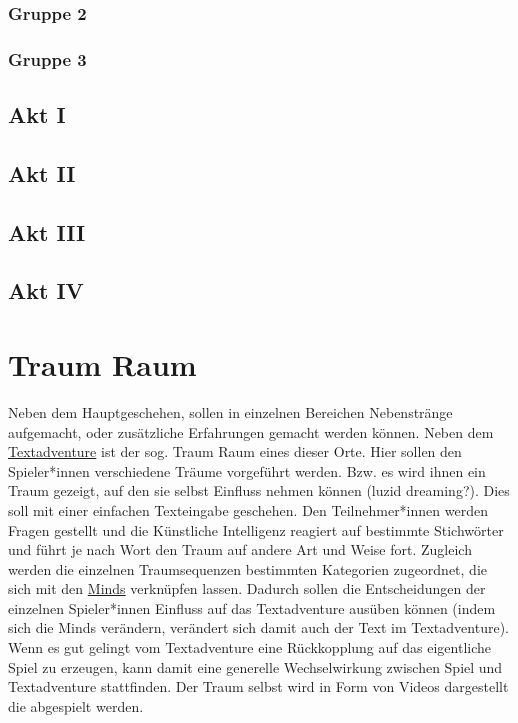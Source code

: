 \documentclass[12pt, a4paper, openany]{report}
\begin{document}
\subsection{Gruppe 2}
\subsection{Gruppe 3}
\section{Akt I}
\section{Akt II}
\section{Akt III}
\section{Akt IV}



\chapter{Traum Raum}
Neben dem Hauptgeschehen, sollen in einzelnen Bereichen Nebenstränge aufgemacht, oder zusätzliche Erfahrungen gemacht werden können. 
Neben dem \hyperref[textadventure]{Textadventure} ist der sog. \glqq Traum Raum\grqq{} eines dieser Orte.
Hier sollen den Spieler*innen verschiedene Träume vorgeführt werden. 
Bzw. es wird ihnen ein Traum gezeigt, auf den sie selbst Einfluss nehmen können (luzid dreaming?).
Dies soll mit einer einfachen Texteingabe geschehen.
Den Teilnehmer*innen werden Fragen gestellt und die \glqq Künstliche Intelligenz\grqq{} reagiert auf bestimmte Stichwörter und führt je nach Wort den Traum auf andere Art und Weise fort.
Zugleich werden die einzelnen Traumsequenzen bestimmten Kategorien zugeordnet, die sich mit den \hyperref[minds]{Minds} verknüpfen lassen.
Dadurch sollen die Entscheidungen der einzelnen Spieler*innen Einfluss auf das Textadventure ausüben können (indem sich die Minds verändern, verändert sich damit auch der Text im Textadventure).
Wenn es gut gelingt vom Textadventure eine Rückkopplung auf das eigentliche Spiel zu erzeugen, kann damit eine generelle Wechselwirkung zwischen Spiel und Textadventure stattfinden.
Der Traum selbst wird in Form von Videos dargestellt die abgespielt werden.\\
\end{document}
